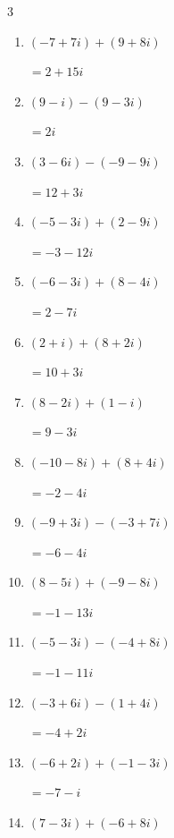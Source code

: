 \begin{multicols}{3}
\begin{enumerate}
  \item $\displaystyle (-7+7i) + (9+8i)$

        $\displaystyle =2+15i$

  \item $\displaystyle (9-i) - (9-3i)$

        $\displaystyle =2i$

  \item $\displaystyle (3-6i) - (-9-9i)$

        $\displaystyle =12+3i$

  \item $\displaystyle (-5-3i) + (2-9i)$

        $\displaystyle =-3-12i$

  \item $\displaystyle (-6-3i) + (8-4i)$

        $\displaystyle =2-7i$

  \item $\displaystyle (2+i) + (8+2i)$

        $\displaystyle =10+3i$

  \item $\displaystyle (8-2i) + (1-i)$

        $\displaystyle =9-3i$

  \item $\displaystyle (-10-8i) + (8+4i)$

        $\displaystyle =-2-4i$

  \item $\displaystyle (-9+3i) - (-3+7i)$

        $\displaystyle =-6-4i$

  \item $\displaystyle (8-5i) + (-9-8i)$

        $\displaystyle =-1-13i$

  \item $\displaystyle (-5-3i) - (-4+8i)$

        $\displaystyle =-1-11i$

  \item $\displaystyle (-3+6i) - (1+4i)$

        $\displaystyle =-4+2i$

  \item $\displaystyle (-6+2i) + (-1-3i)$

        $\displaystyle =-7-i$

  \item $\displaystyle (7-3i) + (-6+8i)$


\end{enumerate}
\end{multicols}
